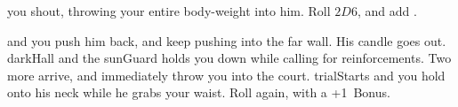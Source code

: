 you shout, throwing your entire body-weight into him.
Roll $2D6$, and add .

\begin{selectPath}
  {and you push him back, and keep pushing into the far wall.
  His candle goes out.}%
  {darkHall}
  {and the \gls{sunGuard} holds you down while calling for reinforcements.
  Two more arrive, and immediately throw you into the \gls{court}.}%
  {trialStarts}
  {and you hold onto his neck while he grabs your waist.
  Roll again, with a +1~Bonus.}%
  {}
\end{selectPath}
